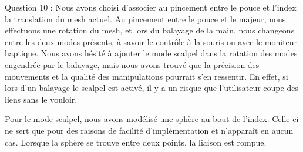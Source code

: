 \documentclass[a4paper,12pt]{article}
\begin{document}
Question 10 : Nous avons choisi d'associer au pincement entre le pouce et l'index la translation du mesh actuel. Au pincement entre le pouce et le majeur, nous effectuons une rotation du mesh, et lors du balayage de la main, nous changeons entre les deux modes présents, à savoir le contrôle à la souris ou avec le moniteur haptique. Nous avons hésité à ajouter le mode \og{}scalpel\fg{} dans la rotation des modes engendrée par le balayage, mais nous avons trouvé que la précision des mouvements et la qualité des manipulations pourrait s'en ressentir. En effet, si lors d'un balayage le scalpel est activé, il y a un risque que l'utilisateur coupe des liens sans le vouloir.

Pour le mode \og{}scalpel\fg{}, nous avons modélisé une sphère au bout de l'index. Celle-ci ne sert que pour des raisons de facilité d'implémentation et n'apparaît en aucun cas. Lorsque la sphère se trouve entre deux points, la liaison est rompue.
\end{document}

